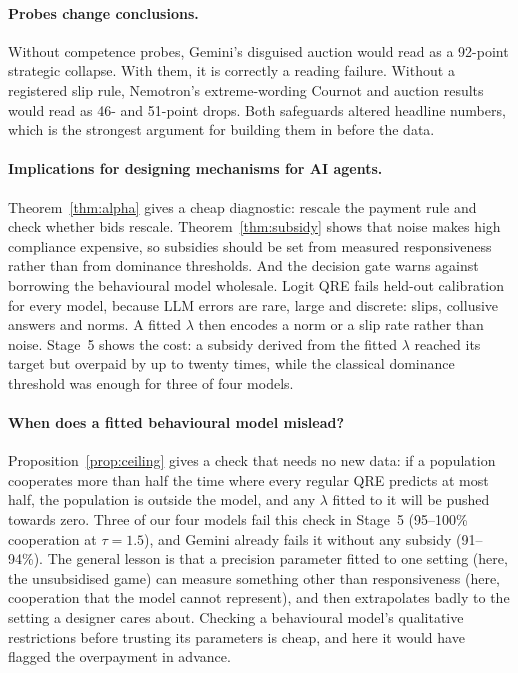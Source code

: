 \documentclass[10pt]{article}
\theoremstyle{definition}
\theoremstyle{remark}
\newcommand{\lam}{\lambda}
\begin{document}
\paragraph{Probes change conclusions.} Without competence probes, Gemini's disguised auction
would read as a 92-point strategic collapse. With them, it is correctly a reading failure.
Without a registered slip rule, Nemotron's extreme-wording Cournot and auction results would
read as 46- and 51-point drops. Both safeguards altered headline numbers, which is the strongest
argument for building them in before the data.

\paragraph{Implications for designing mechanisms for AI agents.} Theorem~\ref{thm:alpha} gives a
cheap diagnostic: rescale the payment rule and check whether bids rescale. Theorem~\ref{thm:subsidy}
shows that noise makes high compliance expensive, so subsidies should be set from measured
responsiveness rather than from dominance thresholds. And the decision gate warns against borrowing the
behavioural model wholesale. Logit QRE fails held-out calibration for every model, because LLM
errors are rare, large and discrete: slips, collusive answers and norms. A fitted $\lam$ then
encodes a norm or a slip rate rather than noise. Stage~5 shows the cost: a subsidy derived from
the fitted $\lam$ reached its target but overpaid by up to twenty times, while the classical
dominance threshold was enough for three of four models.

\paragraph{When does a fitted behavioural model mislead?} Proposition~\ref{prop:ceiling} gives a
check that needs no new data: if a population cooperates more than half the time where every
regular QRE predicts at most half, the population is outside the model, and any $\lam$ fitted to
it will be pushed towards zero. Three of our four models fail this check in Stage~5 (95--100\%
cooperation at $\tau=1.5$), and Gemini already fails it without any subsidy (91--94\%). The general lesson is that a precision parameter fitted to one
setting (here, the unsubsidised game) can measure something other than responsiveness (here,
cooperation that the model cannot represent), and then extrapolates badly to the setting a
designer cares about. Checking a behavioural model's qualitative restrictions before trusting its
parameters is cheap, and here it would have flagged the overpayment in advance.
\end{document}
